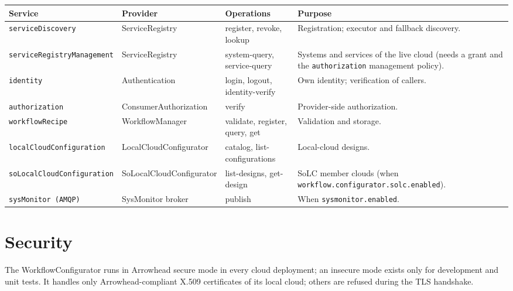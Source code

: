 \documentclass[a4paper]{arrowhead}
\begin{document}
{\small
\begin{longtable}{|p{3.4cm}|p{3.2cm}|p{3.6cm}|p{5.6cm}|}

\hline
\rowcolor{gray!33} Service & Provider & Operations & Purpose \\ \hline
\endhead
\texttt{serviceDiscovery} & ServiceRegistry & register, revoke, lookup & Registration; executor and fallback discovery. \\ \hline
\texttt{serviceRegistryManagement} & ServiceRegistry & system-query, service-query & Systems and services of the live cloud (needs a grant and the \texttt{authorization} management policy). \\ \hline
\texttt{identity} & Authentication & login, logout, identity-verify & Own identity; verification of callers. \\ \hline
\texttt{authorization} & ConsumerAuthorization & verify & Provider-side authorization. \\ \hline
\texttt{workflowRecipe} & WorkflowManager & validate, register, query, get & Validation and storage. \\ \hline
\texttt{localCloudConfiguration} & LocalCloudConfigurator & catalog, list-configurations & Local-cloud designs. \\ \hline
\texttt{soLocalCloudConfiguration} & SoLocalCloudConfigurator & list-designs, get-design & SoLC member clouds (when \texttt{workflow.configurator.solc.enabled}). \\ \hline
\texttt{sysMonitor (AMQP)} & SysMonitor broker & publish & When \texttt{sysmonitor.enabled}. \\ \hline
\end{longtable}
}


\newpage
\section{Security}
\label{sec:security}
The WorkflowConfigurator runs in Arrowhead secure mode in every cloud deployment; an insecure mode exists only for development and
unit tests. It handles only Arrowhead-compliant X.509 certificates of its local cloud; others are refused during the
TLS handshake.
\end{document}
